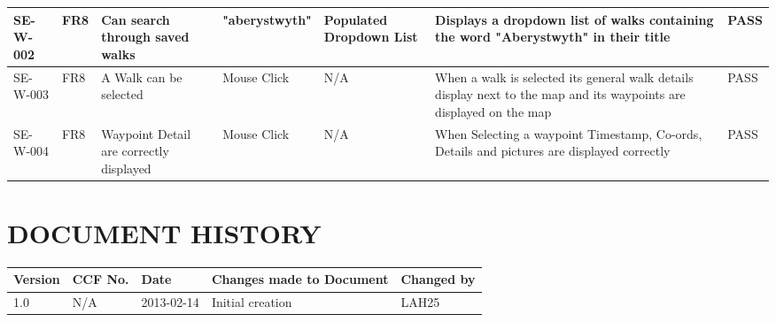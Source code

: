 \documentclass{project}
\begin{document}
\begin{longtable}{ | p{1cm} | p{1cm} | p{2.5cm} | p{2.5cm} | p{2.5cm} | p{2.5cm} | p{1cm} |}
SE-W-002
& FR8
& Can search through saved walks
& "aberystwyth"
& Populated Dropdown List
& Displays a dropdown list of walks containing the word "Aberystwyth" in their title 
& PASS\\ \hline

SE-W-003
& FR8
& A Walk can be selected
& Mouse Click
& N/A
& When a walk is selected its general walk details display next to the 
map and its waypoints are displayed on the map
& PASS \\ \hline

SE-W-004
& FR8
& Waypoint Detail are correctly displayed
& Mouse Click
& N/A
& When Selecting a waypoint Timestamp, Co-ords, Details and pictures are displayed correctly
& PASS\\ \hline

\end{longtable}





\section*{DOCUMENT HISTORY}
\begin{flushleft}
\begin{tabular}{ | p{1.5cm} | p{1cm} | p{2cm} | p{6cm}| p{1.5cm}| }
\hline
Version & CCF No. & Date & Changes made to Document & Changed by \\
\hline

1.0 & N/A & 2013-02-14 & Initial creation & LAH25 \\ \hline


\end{tabular}
\end{flushleft}
\label{thelastpage}
\end{document}
